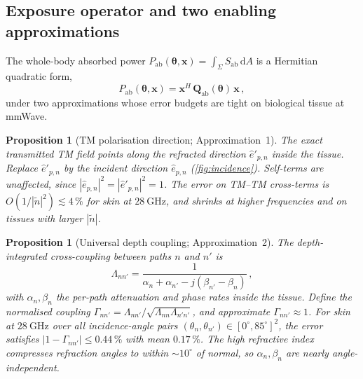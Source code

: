 \documentclass[journal,twocolumn,10pt]{IEEEtran}
\theoremstyle{plain}
\newtheorem{proposition}[theorem]{Proposition}
\theoremstyle{definition}
\theoremstyle{remark}
\newcommand{\xx}{\mathbf{x}}
\newcommand{\Sab}{S_{\mathrm{ab}}}
\newcommand{\Pabs}{P_{\mathrm{ab}}}
\newcommand{\Qabs}{\mathbf{Q}_{\mathrm{ab}}}
\newcommand{\thetab}{\bm{\theta}}
\newcommand{\ntilde}{\tilde{n}}
\begin{document}
\subsection{Exposure operator and two enabling approximations}

The whole-body absorbed power
$\Pabs(\thetab,\xx) = \int_{\Sigma}\Sab\,\mathrm{d}A$ is a Hermitian
quadratic form,
\begin{equation}\label{eq:Qabs}
  \Pabs(\thetab,\xx) = \xx^{H}\,\Qabs(\thetab)\,\xx\,,
\end{equation}
under two approximations whose error budgets are tight on
biological tissue at mmWave.

\begin{proposition}[TM polarisation direction; Approximation~1]\label{prop:approx1}
The exact transmitted TM field points along the refracted direction
$\hat{e}'_{p,n}$ inside the tissue. Replace $\hat{e}'_{p,n}$ by the
incident direction $\hat{e}_{p,n}$ (\cref{fig:incidence}). Self-terms
are unaffected, since $|\hat{e}_{p,n}|^2 = |\hat{e}'_{p,n}|^2 = 1$.
The error on TM--TM cross-terms is $O(1/|\ntilde|^2) \lesssim 4\,\%$
for skin at $28~\mathrm{GHz}$, and shrinks at higher frequencies and
on tissues with larger $|\ntilde|$.
\end{proposition}

\begin{proposition}[Universal depth coupling; Approximation~2]\label{prop:approx2}
The depth-integrated cross-coupling between paths $n$ and $n'$ is
\begin{equation}\label{eq:Lambda}
  \Lambda_{nn'} = \frac{1}{\alpha_n + \alpha_{n'}
  - j(\beta_{n'} - \beta_n)}\,,
\end{equation}
with $\alpha_n, \beta_n$ the per-path attenuation and phase rates
inside the tissue. Define the normalised coupling
$\Gamma_{nn'} = \Lambda_{nn'} / \sqrt{\Lambda_{nn}\Lambda_{n'n'}}$,
and approximate $\Gamma_{nn'} \approx 1$. For skin at
$28~\mathrm{GHz}$ over all incidence-angle pairs
$(\theta_n,\theta_{n'}) \in [0^{\circ},85^{\circ}]^2$, the error
satisfies $|1 - \Gamma_{nn'}| \leq 0.44\,\%$ with mean $0.17\,\%$.
The high refractive index compresses refraction angles to within
$\sim\!10^{\circ}$ of normal, so $\alpha_n,\beta_n$ are nearly
angle-independent.
\end{proposition}
\end{document}
